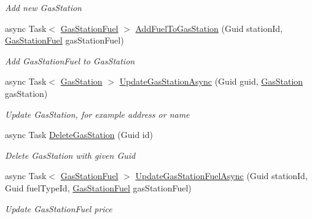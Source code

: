 \begin{DoxyCompactItemize}
\begin{DoxyCompactList}\small\item\em Add new Gas\+Station \end{DoxyCompactList}\item 
async Task$<$ \mbox{\hyperlink{class_gasoline_1_1_data_1_1_models_1_1_gas_station_fuel}{Gas\+Station\+Fuel}} $>$ \mbox{\hyperlink{class_gasoline_1_1_data_1_1_services_1_1_gas_station_service_ab9690eb56ba3a4a9c02d3ab8424990b0}{Add\+Fuel\+To\+Gas\+Station}} (Guid station\+Id, \mbox{\hyperlink{class_gasoline_1_1_data_1_1_models_1_1_gas_station_fuel}{Gas\+Station\+Fuel}} gas\+Station\+Fuel)
\begin{DoxyCompactList}\small\item\em Add Gas\+Station\+Fuel to Gas\+Station \end{DoxyCompactList}\item 
async Task$<$ \mbox{\hyperlink{class_gasoline_1_1_data_1_1_models_1_1_gas_station}{Gas\+Station}} $>$ \mbox{\hyperlink{class_gasoline_1_1_data_1_1_services_1_1_gas_station_service_a71d61038244d2ebd2543e76073c7ac91}{Update\+Gas\+Station\+Async}} (Guid guid, \mbox{\hyperlink{class_gasoline_1_1_data_1_1_models_1_1_gas_station}{Gas\+Station}} gas\+Station)
\begin{DoxyCompactList}\small\item\em Update Gas\+Station, for example address or name \end{DoxyCompactList}\item 
async Task \mbox{\hyperlink{class_gasoline_1_1_data_1_1_services_1_1_gas_station_service_ade4d74ba7e340358a006867f2abe4232}{Delete\+Gas\+Station}} (Guid id)
\begin{DoxyCompactList}\small\item\em Delete Gas\+Station with given Guid \end{DoxyCompactList}\item 
async Task$<$ \mbox{\hyperlink{class_gasoline_1_1_data_1_1_models_1_1_gas_station_fuel}{Gas\+Station\+Fuel}} $>$ \mbox{\hyperlink{class_gasoline_1_1_data_1_1_services_1_1_gas_station_service_ac437b0ab0507030c7f91623fef829461}{Update\+Gas\+Station\+Fuel\+Async}} (Guid station\+Id, Guid fuel\+Type\+Id, \mbox{\hyperlink{class_gasoline_1_1_data_1_1_models_1_1_gas_station_fuel}{Gas\+Station\+Fuel}} gas\+Station\+Fuel)
\begin{DoxyCompactList}\small\item\em Update Gas\+Station\+Fuel price \end{DoxyCompactList}\item 

\end{DoxyCompactItemize}
